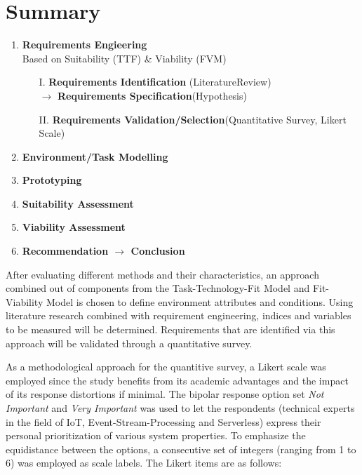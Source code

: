 \section{Summary}\label{chp:researchMethodEND}

\begin{enumerate}[nolistsep]
        \item \textbf{Requirements Engieering}\\
            Based on Suitability (TTF) \& Viability (FVM)
            \begin{enumerate}
                \item[I.] \textbf{Requirements Identification} (LiteratureReview)\\
                    $\longrightarrow$ \textbf{Requirements Specification}(Hypothesis)
                \item[II.] \textbf{Requirements Validation/Selection}(Quantitative Survey, Likert Scale)
            \end{enumerate}
        \item \textbf{Environment/Task Modelling}
        \item \textbf{Prototyping}
        \item \textbf{Suitability Assessment} 
        \item \textbf{Viability Assessment}
        \item \textbf{Recommendation $\longrightarrow$ Conclusion}
\end{enumerate}

After evaluating different methods and their characteristics, an approach combined out of components from the Task-Technology-Fit Model and Fit-Viability Model is chosen to define environment attributes and conditions. Using literature research combined with requirement engineering, indices and variables to be measured will be determined. Requirements that are identified via this approach will be validated through a quantitative survey. 

As a methodological approach for the quantitive survey, a Likert scale was employed since the study benefits from its academic advantages and the impact of its response distortions if minimal. The bipolar response option set \textit{Not Important} and \textit{Very Important} was used to let the respondents (technical experts in the field of IoT, Event-Stream-Processing and Serverless) express their personal prioritization of various system properties. To emphasize the equidistance between the options, a consecutive set of integers (ranging from 1 to 6) was employed as scale labels. The Likert items are as follows:

